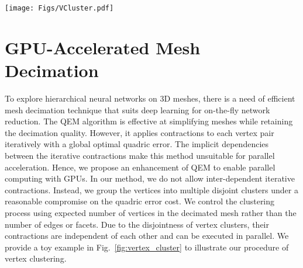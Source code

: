 \begin{figure*}[!t]
\centering
\texttt{[image: Figs/VCluster.pdf]}\\
\vspace{-3mm}
\caption{Illustration of the vertex clustering process. (a) An input mesh with twelve edges (vertex pairs). We sort the vertex pairs in ascending order according to their quadric errors. (b) Then, we initialize the clusters as $\{c,d\},\{a,g\},\{e,f\}$ using the disjoint vertex pairs $(c,d),(a,g),(e,f)$ - shown by red, green and blue. (c) We group the remaining 
vertex $b$ to the vertex cluster $\{a,g\}$ because $(a,b)$ holds the smallest quadric error among all pairs containing $b$, \ie $(a,b),(b,g),(b,c)$. Finally, the vertex clusters become $\{c,d\},\{a,b,g\},\{e,f\}$. (d) We construct the decimated mesh by applying vertex contraction to each cluster. 
The target position of contraction is computed as the average location of all vertices in the cluster.} 
\label{fig:vertex_cluster}
\vspace{-2mm}
\end{figure*}

\section{GPU-Accelerated Mesh Decimation}
To explore hierarchical neural networks on 3D meshes, there is a need of  efficient mesh decimation technique that suits deep learning for on-the-fly network reduction. The QEM algorithm \cite{garland1997surface} is effective at simplifying meshes while retaining the decimation quality. However, it applies contractions to each vertex pair iteratively with a global optimal quadric error. 
The implicit dependencies between the iterative contractions make this method unsuitable for parallel acceleration. 
Hence, we propose an enhancement of QEM to enable parallel computing with GPUs. 
In our method, we do not allow inter-dependent iterative contractions. 
Instead, we group the vertices into multiple disjoint clusters under a reasonable compromise on the 
quadric error cost. 
We control the clustering process using expected number of vertices in the decimated mesh rather than the number of edges or facets. 
Due to the disjointness of vertex clusters, their contractions are independent of each other and can be executed in parallel. 
We provide a toy example in Fig.~\ref{fig:vertex_cluster} to illustrate our procedure of vertex clustering.

